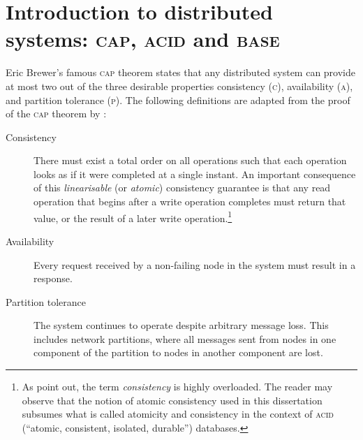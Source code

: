\documentclass[12pt,chapterprefix=true,toc=bibliography,numbers=noendperiod,
               footnotes=multiple,twoside]{scrreprt}
\begin{document}

\section[Introduction to distributed systems]{Introduction to distributed systems: \textsc{cap}, \textsc{acid} and \textsc{base}}
\label{ssc:cap-acid-and-base}

Eric Brewer's famous \textsc{cap} theorem states that any distributed system can provide at most two out of the three desirable properties consistency (\textsc{c}), availability (\textsc{a}), and partition tolerance (\textsc{p}).\autocite{cap} The following definitions are adapted from the proof of the \textsc{cap} theorem by \citeauthor{capproof}:\autocite{capproof}

\begin{description}
    \item[Consistency] There must exist a total order on all operations such that each operation looks as if it were completed at a single instant. An important consequence of this \emph{linearisable} (or \emph{atomic}) consistency guarantee is that any read operation that begins after a write operation completes must return that value, or the result of a later write operation.\footnote{As \textcite{capproof} point out, the term \emph{consistency} is highly overloaded. The reader may observe that the notion of atomic consistency used in this dissertation subsumes what is called atomicity and consistency in the context of \textsc{acid} (\enquote{atomic, consistent, isolated, durable}) databases.}
    \item[Availability] Every request received by a non-failing node in the system must result in a response.
    \item[Partition tolerance] The system continues to operate despite arbitrary message loss. This includes network partitions, where all messages sent from nodes in one component of the partition to nodes in another component are lost.
\end{description}
\end{document}
